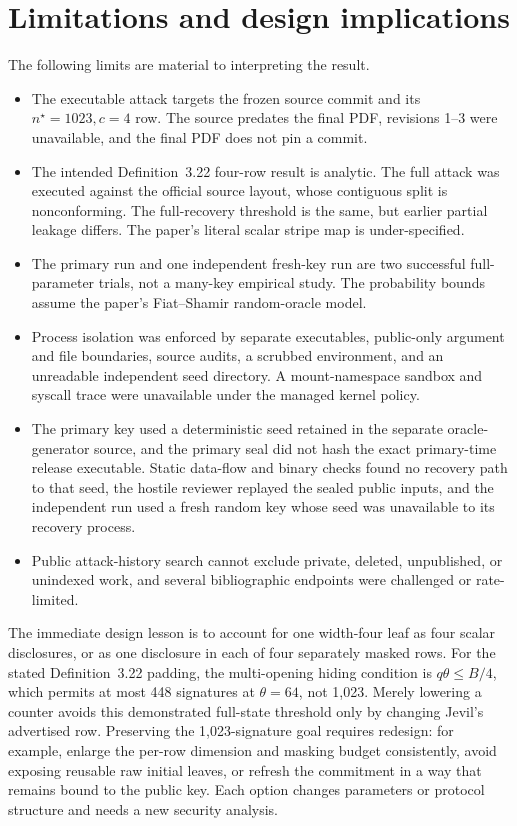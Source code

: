 \documentclass[10pt,a4paper]{article}
\begin{document}
\section{Limitations and design implications}

The following limits are material to interpreting the result.
\begin{itemize}
  \item The executable attack targets the frozen source commit and its
        $n^\star=1023,c=4$ row. The source predates the final PDF, revisions
        1--3 were unavailable, and the final PDF does not pin a commit.
  \item The intended Definition~3.22 four-row result is analytic. The full
        attack was executed against the official source layout, whose
        contiguous split is nonconforming. The full-recovery threshold is the
        same, but earlier partial leakage differs. The paper's literal scalar
        stripe map is under-specified.
  \item The primary run and one independent fresh-key run are two successful
        full-parameter trials, not a many-key empirical study. The probability
        bounds assume the paper's Fiat--Shamir random-oracle model.
  \item Process isolation was enforced by separate executables, public-only
        argument and file boundaries, source audits, a scrubbed environment,
        and an unreadable independent seed directory. A mount-namespace
        sandbox and syscall trace were unavailable under the managed kernel
        policy.
  \item The primary key used a deterministic seed retained in the separate
        oracle-generator source, and the primary seal did not hash the exact
        primary-time release executable. Static data-flow and binary checks
        found no recovery path to that seed, the hostile reviewer replayed the
        sealed public inputs, and the independent run used a fresh random key
        whose seed was unavailable to its recovery process.
  \item Public attack-history search cannot exclude private, deleted,
        unpublished, or unindexed work, and several bibliographic endpoints
        were challenged or rate-limited.
\end{itemize}

The immediate design lesson is to account for one width-four leaf as four
scalar disclosures, or as one disclosure in each of four separately masked
rows. For the stated Definition~3.22 padding, the multi-opening hiding
condition is $q\theta\leq B/4$, which permits at most 448 signatures at
$\theta=64$, not 1,023. Merely lowering a counter avoids this demonstrated
full-state threshold only by changing Jevil's advertised row. Preserving the
1,023-signature goal requires redesign: for example, enlarge the per-row
dimension and masking budget consistently, avoid exposing reusable raw initial
leaves, or refresh the commitment in a way that remains bound to the public
key. Each option changes parameters or protocol structure and needs a new
security analysis.
\end{document}
